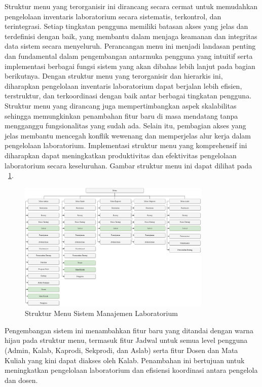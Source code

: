 Struktur menu yang terorganisir ini dirancang secara cermat untuk memudahkan pengelolaan inventaris laboratorium secara sistematis, terkontrol, dan terintegrasi. Setiap tingkatan pengguna memiliki batasan akses yang jelas dan terdefinisi dengan baik, yang membantu dalam menjaga keamanan dan integritas data sistem secara menyeluruh. Perancangan menu ini menjadi landasan penting dan fundamental dalam pengembangan antarmuka pengguna yang intuitif serta implementasi berbagai fungsi sistem yang akan dibahas lebih lanjut pada bagian berikutnya. Dengan struktur menu yang terorganisir dan hierarkis ini, diharapkan pengelolaan inventaris laboratorium dapat berjalan lebih efisien, terstruktur, dan terkoordinasi dengan baik antar berbagai tingkatan pengguna. Struktur menu yang dirancang juga mempertimbangkan aspek skalabilitas sehingga memungkinkan penambahan fitur baru di masa mendatang tanpa mengganggu fungsionalitas yang sudah ada. Selain itu, pembagian akses yang jelas membantu mencegah konflik wewenang dan memperjelas alur kerja dalam pengelolaan laboratorium. Implementasi struktur menu yang komprehensif ini diharapkan dapat meningkatkan produktivitas dan efektivitas pengelolaan laboratorium secara keseluruhan. Gambar struktur menu ini dapat dilihat pada \pic~\ref{StrukturMenuILMIS}.

\begin{figure}
	\centering
	\includegraphics[width=0.82\textwidth]{konten/gambar/menu.png}
	\caption{Struktur Menu Sistem Manajemen Laboratorium}
	\label{StrukturMenuILMIS}
\end{figure}

Pengembangan sistem ini menambahkan fitur baru yang ditandai dengan warna hijau pada struktur menu, termasuk fitur Jadwal untuk semua level pengguna (Admin, Kalab, Kaprodi, Sekprodi, dan Aslab) serta fitur Dosen dan Mata Kuliah yang kini dapat diakses oleh Kalab. Penambahan ini bertujuan untuk meningkatkan pengelolaan laboratorium dan efisiensi koordinasi antara pengelola dan dosen.

